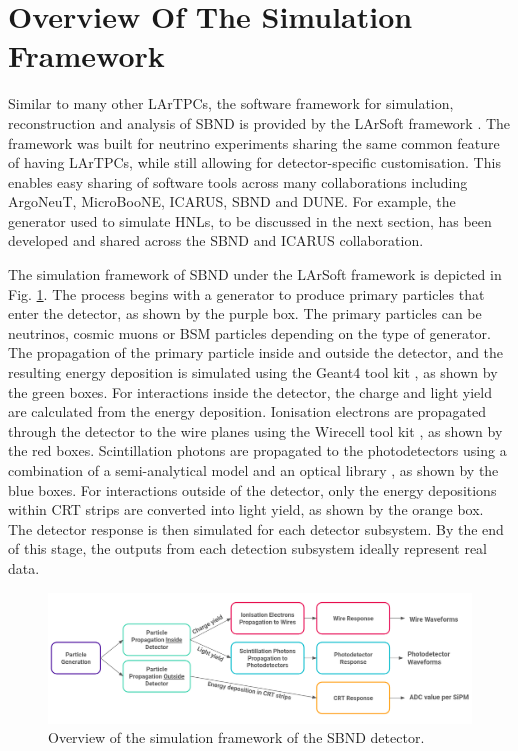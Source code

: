 \newpage

\section{Overview Of The Simulation Framework}
\label{sec:overview_sim}

Similar to many other LArTPCs, the software framework for simulation, reconstruction and analysis of SBND is provided by the LArSoft framework \cite{larsoft}. 
The framework was built for neutrino experiments sharing the same common feature of having LArTPCs, while still allowing for detector-specific customisation. 
This enables easy sharing of software tools across many collaborations including ArgoNeuT, MicroBooNE, ICARUS, SBND and DUNE. 
For example, the generator used to simulate HNLs, to be discussed in the next section, has been developed and shared across the SBND and ICARUS collaboration.

The simulation framework of SBND under the LArSoft framework is depicted in Fig. \ref{fig:Sim_Workflow}.
The process begins with a generator to produce primary particles that enter the detector, as shown by the purple box.
The primary particles can be neutrinos, cosmic muons or BSM particles depending on the type of generator.
The propagation of the primary particle inside and outside the detector, and the resulting energy deposition is simulated using the Geant4 tool kit \cite{geant4}, as shown by the green boxes.
For interactions inside the detector, the charge and light yield are calculated from the energy deposition.
Ionisation electrons are propagated through the detector to the wire planes using the Wirecell tool kit \cite{wirecell}, as shown by the red boxes.
Scintillation photons are propagated to the photodetectors using a combination of a semi-analytical model and an optical library \cite{sbnd_pds_paper}, as shown by the blue boxes.
For interactions outside of the detector, only the energy depositions within CRT strips are converted into light yield, as shown by the orange box.
The detector response is then simulated for each detector subsystem.
By the end of this stage, the outputs from each detection subsystem ideally represent real data.

\begin{figure}[htbp!] 
\centering    
\includegraphics[width=1.0\textwidth]{Sim_Workflow}
\caption[Simulation Framework of SBND]{
Overview of the simulation framework of the SBND detector.
}
\label{fig:Sim_Workflow}
\end{figure}

